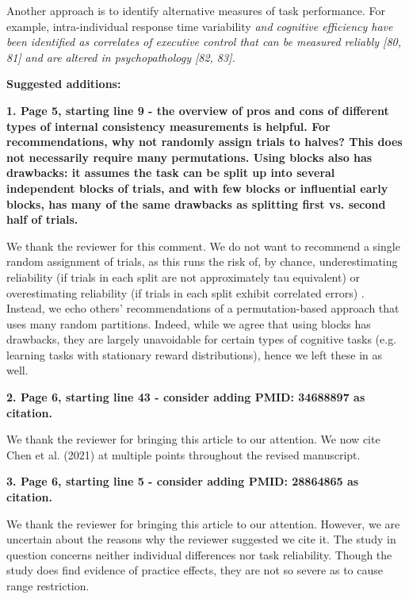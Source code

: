 \documentclass[a4paper,12pt]{article}
\begin{document}
\begin{displayquote}
    Another approach is to identify alternative measures of task performance. For example, intra-individual response time variability \textit{and cognitive efficiency have been identified as correlates of executive control that can be measured reliably [80, 81] and are altered in psychopathology [82, 83].}
\end{displayquote}

\textbf{Suggested additions:}

\textbf{1. Page 5, starting line 9 - the overview of pros and cons of different types of internal consistency measurements is helpful. For recommendations, why not randomly assign trials to halves? This does not necessarily require many permutations. Using blocks also has drawbacks: it assumes the task can be split up into several independent blocks of trials, and with few blocks or influential early blocks, has many of the same drawbacks as splitting first vs. second half of trials.}

We thank the reviewer for this comment. We do not want to recommend a single random assignment of trials, as this runs the risk of, by chance, underestimating reliability (if trials in each split are not approximately tau equivalent) or overestimating reliability (if trials in each split exhibit correlated errors) \cite{Parsons2019-jw, Pronk2022-mq}. Instead, we echo others' recommendations of a permutation-based approach that uses many random partitions. Indeed, while we agree that using blocks has drawbacks, they are largely unavoidable for certain types of cognitive tasks (e.g. learning tasks with stationary reward distributions), hence we left these in as well. 

\textbf{2. Page 6, starting line 43 - consider adding PMID: 34688897 as citation.}

We thank the reviewer for bringing this article to our attention. We now cite Chen et al. (2021) \cite{chen2021trial} at multiple points throughout the revised manuscript.

\textbf{3. Page 6, starting line 5 - consider adding PMID: 28864865 as citation.}

We thank the reviewer for bringing this article \cite{howlett2017effect} to our attention. However, we are uncertain about the reasons why the reviewer suggested we cite it. The study in question concerns neither individual differences nor task reliability. Though the study does find evidence of practice effects, they are not so severe as to cause range restriction. 
\end{document}
